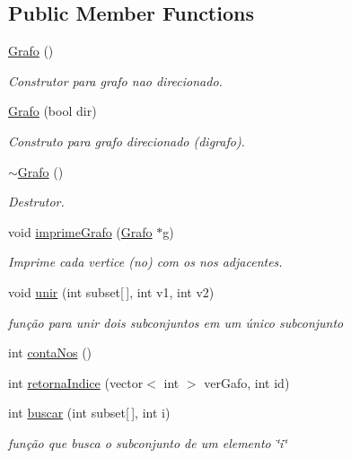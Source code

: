 \subsection*{Public Member Functions}
\begin{DoxyCompactItemize}
\item 
\hyperlink{class_grafo_ab810bbe26a98e9af6661ccddff66b03b}{Grafo} ()
\begin{DoxyCompactList}\small\item\em Construtor para grafo nao direcionado. \end{DoxyCompactList}\item 
\hyperlink{class_grafo_ac389a7c921f396ed4ed0f296a90a649e}{Grafo} (bool dir)
\begin{DoxyCompactList}\small\item\em Construto para grafo direcionado (digrafo). \end{DoxyCompactList}\item 
\hyperlink{class_grafo_a16f3fbba0de2667dfba3b657cb7e95ff}{$\sim$\-Grafo} ()
\begin{DoxyCompactList}\small\item\em Destrutor. \end{DoxyCompactList}\item 
void \hyperlink{class_grafo_ac422fb7b1853918b49c5b1446990ab75}{imprime\-Grafo} (\hyperlink{class_grafo}{Grafo} $\ast$g)
\begin{DoxyCompactList}\small\item\em Imprime cada vertice (no) com os nos adjacentes. \end{DoxyCompactList}\item 
void \hyperlink{class_grafo_a5eda2173b173a36459bf831cfcfd262b}{unir} (int subset\mbox{[}$\,$\mbox{]}, int v1, int v2)
\begin{DoxyCompactList}\small\item\em função para unir dois subconjuntos em um único subconjunto \end{DoxyCompactList}\item 
int \hyperlink{class_grafo_a29874190411584284934433db5bf5f99}{conta\-Nos} ()
\item 
int \hyperlink{class_grafo_a68e6656216b32cf61a2370cfcd6573a3}{retorna\-Indice} (vector$<$ int $>$ ver\-Gafo, int id)
\item 
int \hyperlink{class_grafo_a0ac5b35231457cbf54aa7d19f21b1f1e}{buscar} (int subset\mbox{[}$\,$\mbox{]}, int i)
\begin{DoxyCompactList}\small\item\em função que busca o subconjunto de um elemento \char`\"{}i\char`\"{} \end{DoxyCompactList}\item 

\end{DoxyCompactItemize}
